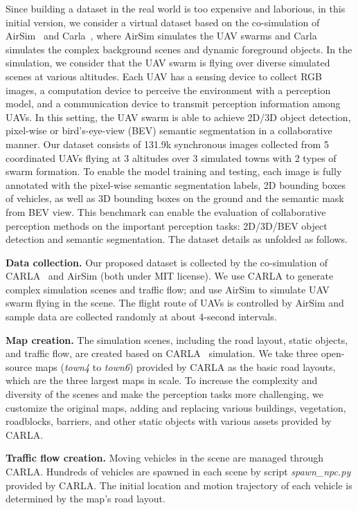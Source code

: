 \documentclass{article}
\begin{document}
Since building a dataset in the real world is too expensive and laborious, in this initial version,  we consider a virtual dataset based on the co-simulation of AirSim~\cite{Airsim} and Carla~\cite{carla}, where AirSim simulates the UAV swarms and Carla simulates the complex background scenes and dynamic foreground objects. In the simulation, we consider that the UAV swarm is flying over diverse simulated scenes at various altitudes. Each UAV has a sensing device to collect RGB images, a computation device to perceive the environment with a perception model, and a communication device to transmit perception information among UAVs. In this setting, the UAV swarm is able to achieve 2D/3D object detection, pixel-wise or bird's-eye-view (BEV) semantic segmentation in a collaborative manner. Our dataset consists of 131.9k synchronous images collected from 5 coordinated UAVs flying at 3 altitudes over 3 simulated towns with 2 types of swarm formation. To enable the model training and testing, each image is fully annotated with the pixel-wise semantic segmentation labels, 2D bounding boxes of vehicles, as well as 3D bounding boxes on the ground and the semantic mask from BEV view. This benchmark can enable the evaluation of collaborative perception methods on the important perception tasks: 2D/3D/BEV object detection and semantic segmentation. The dataset details as unfolded as follows.

\textbf{Data collection.} Our proposed dataset is collected by the co-simulation of CARLA~\cite{carla} and AirSim\cite{Airsim} (both under MIT license). We use CARLA to generate complex simulation scenes and traffic flow; and use AirSim to simulate UAV swarm flying in the scene. The flight route of UAVs is controlled by AirSim and sample data are collected randomly at about 4-second intervals.

\textbf{Map creation.} The simulation scenes, including the road layout, static objects, and traffic flow, are created based on CARLA~\cite{carla} simulation. We take three open-source maps (\emph{town4} to \emph{town6}) provided by CARLA as the basic road layouts, which are the three largest maps in scale. To increase the complexity and diversity of the scenes and make the perception tasks more challenging, we customize the original maps, adding and replacing various buildings, vegetation, roadblocks, barriers, and other static objects with various assets provided by CARLA.

\textbf{Traffic flow creation.} Moving vehicles in the scene are managed through CARLA. Hundreds of vehicles are spawned in each scene by script \emph{spawn\_npc.py} provided by CARLA. The initial location and motion trajectory of each vehicle is determined by the map's road layout.
\end{document}
